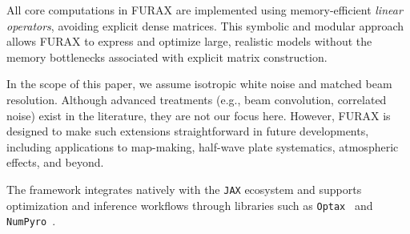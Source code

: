 \documentclass[%
 reprint,
bibnotes,
 amsmath,amssymb,
 aps,
floatfix, 
]{revtex4-2}
\begin{document}
All core computations in FURAX are implemented using memory-efficient \textit{linear operators}, avoiding explicit dense matrices. This symbolic and modular approach allows FURAX to express and optimize large, realistic models without the memory bottlenecks associated with explicit matrix construction.

In the scope of this paper, we assume isotropic white noise and matched beam resolution. Although advanced treatments (e.g., beam convolution, correlated noise) exist in the literature, they are not our focus here. However, FURAX is designed to make such extensions straightforward in future developments, including applications to map-making, half-wave plate systematics, atmospheric effects, and beyond.

The framework integrates natively with the \texttt{JAX} ecosystem and supports optimization and inference workflows through libraries such as \texttt{Optax}~\citep{optax} and \texttt{NumPyro}~\citep{numpyro}.
\end{document}
